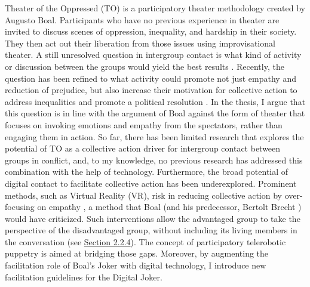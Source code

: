\documentclass[dissertation,math,vertlayout,pdfa,colorlinks]{aaltoseries}
\begin{document}
Theater of the Oppressed (TO) \cite{boalTheatreOppressed2008} is a participatory theater methodology created by Augusto Boal. Participants who have no previous experience in theater are invited to discuss scenes of oppression, inequality, and hardship in their society. They then act out their liberation from those issues using improvisational theater. A still unresolved question in intergroup contact is what kind of activity or discussion between the groups would yield the best results \cite{maozDoesContactWork2011}. Recently, the question has been refined to what activity could promote not just empathy and reduction of prejudice, but also increase their motivation for collective action to address inequalities and promote a political resolution \cite{coccoMobilizingSedativeEffects2024}. In the thesis, I argue that this question is in line with the argument of Boal against the form of theater that focuses on invoking emotions and empathy from the spectators, rather than engaging them in action. So far, there has been limited research that explores the potential of TO as a collective action driver for intergroup contact between groups in conflict, and, to my knowledge, no previous research has addressed this combination with the help of technology. Furthermore, the broad potential of digital contact to facilitate collective action has been underexplored. Prominent methods, such as Virtual Reality (VR), risk in reducing collective action by over-focusing on empathy \cite{messeriLandUnrealVirtual2024}, a method that Boal (and his predecessor, Bertolt Brecht \cite{boalTheatreOppressed2008}) would have criticized. Such interventions allow the advantaged group to take the perspective of the disadvantaged group, without including its living members in the conversation \cite{nashVirtualRealityWitness2018} (see \hyperref[sec:vr_empathy]{Section 2.2.4}). The concept of participatory telerobotic puppetry is aimed at bridging those gaps. Moreover, by augmenting the facilitation role of Boal's Joker with digital technology, I introduce new facilitation guidelines for the Digital Joker.
\end{document}

